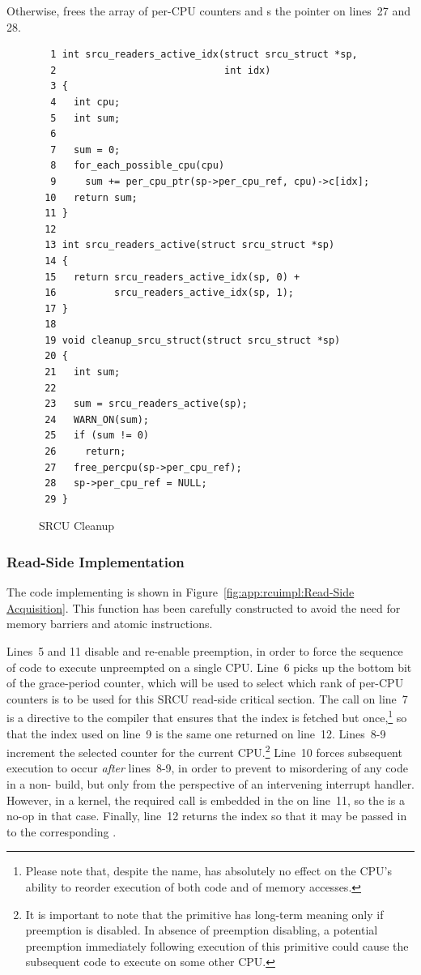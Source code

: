 Otherwise,  frees the array of per-CPU
counters and s the pointer on lines~27 and 28.

\begin{figure}[htbp]
{ \scriptsize
\begin{verbatim}
  1 int srcu_readers_active_idx(struct srcu_struct *sp,
  2                             int idx)
  3 {
  4   int cpu;
  5   int sum;
  6
  7   sum = 0;
  8   for_each_possible_cpu(cpu)
  9     sum += per_cpu_ptr(sp->per_cpu_ref, cpu)->c[idx];
 10   return sum;
 11 }
 12
 13 int srcu_readers_active(struct srcu_struct *sp)
 14 {
 15   return srcu_readers_active_idx(sp, 0) +
 16          srcu_readers_active_idx(sp, 1);
 17 }
 18
 19 void cleanup_srcu_struct(struct srcu_struct *sp)
 20 {
 21   int sum;
 22
 23   sum = srcu_readers_active(sp);
 24   WARN_ON(sum);
 25   if (sum != 0)
 26     return;
 27   free_percpu(sp->per_cpu_ref);
 28   sp->per_cpu_ref = NULL;
 29 }
\end{verbatim}
}
\caption{SRCU Cleanup}
\label{fig:app:rcuimpl:SRCU Cleanup}
\end{figure}

\subsubsection{Read-Side Implementation}
\label{sec:app:rcuimpl:Read-Side Implementation}

The code implementing  is shown in
Figure~\ref{fig:app:rcuimpl:Read-Side Acquisition}.
This function has been carefully constructed to avoid the
need for memory barriers and atomic instructions.

Lines~5 and 11 disable and re-enable preemption, in order to force
the sequence of code to execute unpreempted on a single CPU.
Line~6 picks up the bottom bit of the grace-period counter, which will
be used to select which rank of per-CPU counters is to be used for this
SRCU read-side critical section.
The  call on line~7 is a directive to the compiler
that ensures that the index is
fetched but once,\footnote{
	Please note that, despite the name, 
	has absolutely no effect on the CPU's ability to
	reorder execution of both code and of memory accesses.}
so that the index used on line~9 is the same
one returned on line~12.
Lines~8-9 increment the selected counter for the current CPU.\footnote{
	It is important to note that the  primitive
	has long-term meaning only if preemption is disabled.
	In absence of preemption disabling, a potential preemption
	immediately following execution of this primitive could
	cause the subsequent code to execute on some other CPU.}
Line~10 forces subsequent execution to occur \emph{after}
lines~8-9, in order to prevent to misordering of any code
in a non- build, but only
from the perspective of an intervening interrupt handler.
However, in a  kernel, the required 
call is embedded in the  on line~11, so the
 is a no-op in that case.
Finally, line~12 returns the index so that it may be passed in to the
corresponding .

